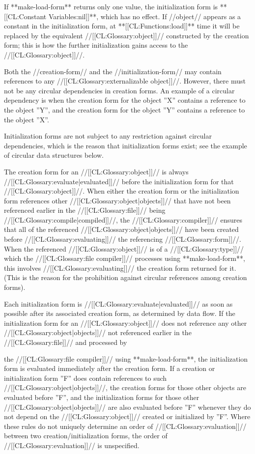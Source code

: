 If **make-load-form** returns only one value, the initialization form is **[[CL:Constant Variables:nil]]**, which has no effect. If //object// appears as a constant in the initialization form, at **[[CL:Functions:load]]** time it will be replaced by the equivalent //[[CL:Glossary:object]]// constructed by the creation form; this is how the further initialization gains access to the //[[CL:Glossary:object]]//.

Both the //creation-form// and the //initialization-form// may contain references to any //[[CL:Glossary:externalizable object]]//. However, there must not be any circular dependencies in creation forms. An example of a circular dependency is when the creation form for the object ''X'' contains a reference to the object ''Y'', and the creation form for the object ''Y'' contains a reference to the object ''X''.

Initialization forms are not subject to any restriction against circular dependencies, which is the reason that initialization forms exist; see the example of circular data structures below.

The creation form for an //[[CL:Glossary:object]]// is always //[[CL:Glossary:evaluate|evaluated]]// before the initialization form for that //[[CL:Glossary:object]]//. When either the creation form or the initialization form references other //[[CL:Glossary:object|objects]]// that have not been referenced earlier in the //[[CL:Glossary:file]]// being //[[CL:Glossary:compile|compiled]]//, the //[[CL:Glossary:compiler]]// ensures that all of the referenced //[[CL:Glossary:object|objects]]// have been created before //[[CL:Glossary:evaluating]]// the referencing //[[CL:Glossary:form]]//. When the referenced //[[CL:Glossary:object]]// is of a //[[CL:Glossary:type]]// which the //[[CL:Glossary:file compiler]]// processes using **make-load-form**, this involves //[[CL:Glossary:evaluating]]// the creation form returned for it. (This is the reason for the prohibition against circular references among creation forms).

Each initialization form is //[[CL:Glossary:evaluate|evaluated]]// as soon as possible after its associated creation form, as determined by data flow. If the initialization form for an //[[CL:Glossary:object]]// does not reference any other //[[CL:Glossary:object|objects]]// not referenced earlier in the //[[CL:Glossary:file]]// and processed by

the //[[CL:Glossary:file compiler]]// using **make-load-form**, the initialization form is evaluated immediately after the creation form. If a creation or initialization form ''F'' does contain references to such //[[CL:Glossary:object|objects]]//, the creation forms for those other objects are evaluated before ''F'', and the initialization forms for those other //[[CL:Glossary:object|objects]]// are also evaluated before ''F'' whenever they do not depend on the //[[CL:Glossary:object]]// created or initialized by ''F''. Where these rules do not uniquely determine an order of //[[CL:Glossary:evaluation]]// between two creation/initialization forms, the order of //[[CL:Glossary:evaluation]]// is unspecified.

